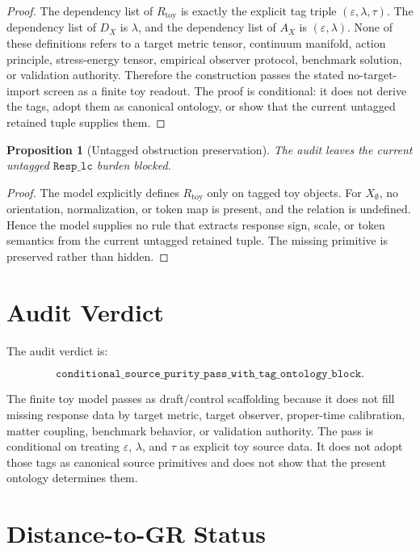 \documentclass[11pt]{article}
\newtheorem{proposition}{Proposition}
\begin{document}
\begin{proof}
The dependency list of \(R_{\mathrm{toy}}\) is exactly the explicit
tag triple \((\varepsilon,\lambda,\tau)\). The dependency list of
\(D_X\) is \(\lambda\), and the dependency list of \(A_X\) is
\((\varepsilon,\lambda)\). None of these definitions refers to a target
metric tensor, continuum manifold, action principle, stress-energy
tensor, empirical observer protocol, benchmark solution, or validation
authority. Therefore the construction passes the stated no-target-import
screen as a finite toy readout. The proof is conditional: it does not
derive the tags, adopt them as canonical ontology, or show that the
current untagged retained tuple supplies them.
\end{proof}

\begin{proposition}[Untagged obstruction preservation]
The audit leaves the current untagged \(\texttt{Resp\_lc}\) burden
blocked.
\end{proposition}

\begin{proof}
The model explicitly defines \(R_{\mathrm{toy}}\) only on tagged toy
objects. For \(X_{\emptyset}\), no orientation, normalization, or token
map is present, and the relation is undefined. Hence the model supplies
no rule that extracts response sign, scale, or token semantics from the
current untagged retained tuple. The missing primitive is preserved
rather than hidden.
\end{proof}

\section{Audit Verdict}

The audit verdict is:

\[
\texttt{conditional\_source\_purity\_pass\_with\_tag\_ontology\_block}.
\]

The finite toy model passes as draft/control scaffolding because it
does not fill missing response data by target metric, target observer,
proper-time calibration, matter coupling, benchmark behavior, or
validation authority. The pass is conditional on treating
\(\varepsilon\), \(\lambda\), and \(\tau\) as explicit toy source data.
It does not adopt those tags as canonical source primitives and does not
show that the present ontology determines them.

\section{Distance-to-GR Status}
\end{document}
